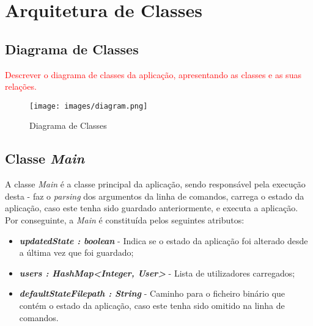 \documentclass[a4paper,12pt]{scrreprt}
\begin{document}
\pagebreak

%
%
%




\chapter{Arquitetura de Classes}
\section{Diagrama de Classes}
\textcolor{red}{
    Descrever o diagrama de classes da aplicação, apresentando as classes e as suas relações.
}


\begin{figure}[!ht]
    \centering
    \texttt{[image: images/diagram.png]}
    \caption{Diagrama de Classes}
    \label{fig:diagrama-classes}
\end{figure}


\section{Classe \textit{Main}}
    A classe \textit{Main} é a classe principal da aplicação, sendo responsável pela execução desta - faz o \textit{parsing} dos argumentos da linha de comandos, carrega o estado da aplicação, caso este tenha sido guardado anteriormente, e executa a aplicação. 
    Por conseguinte, a \textit{Main} é constituída pelos seguintes atributos:

    \begin{itemize}
        \item \textit{\textbf{updatedState : boolean}} - Indica se o estado da aplicação foi alterado desde a última vez que foi guardado;
        \item \textit{\textbf{users : HashMap<Integer, User>}} - Lista de utilizadores carregados;
        \item \textit{\textbf{defaultStateFilepath : String}} - Caminho para o ficheiro binário que contém o estado da aplicação, caso este tenha sido omitido na linha de comandos.
    \end{itemize}
\end{document}
